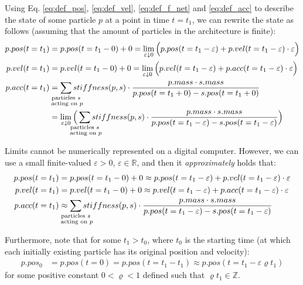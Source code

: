 Using Eq. \eqref{eq:def_pos}, \eqref{eq:def_vel}, \eqref{eq:def_f_net} and \eqref{eq:def_acc} to describe the state of some particle $p$ at a point in time $t=t_1$, we can rewrite the state as follows (assuming that the amount of particles in the architecture is finite):
\begin{align}
    p.pos(t = t_1)  &= p.pos(t = t_1 - 0) + 0 
                    = \lim_{\varepsilon \downarrow 0}\Big(p.pos(t = t_1 - \varepsilon) + p.vel(t = t_1 - \varepsilon) \cdot \varepsilon \Big) \label{eq:pos_eps}\\
    p.vel(t = t_1)  &= p.vel(t = t_1 - 0) + 0 
                    = \lim_{\varepsilon \downarrow 0}\Big(p.vel(t = t_1 - \varepsilon) + p.acc(t = t_1 - \varepsilon) \cdot \varepsilon \Big) \label{eq:vel_eps} \\
    p.acc(t = t_1)  &= \smashoperator{\sum_{\substack{\text{particles $s$}\\\text{ acting on $p$}}}}stiffness(p, s)\cdot\frac{p.mass \cdot s.mass}{p.pos(t=t_1 + 0)-s.pos(t=t_1 + 0)} \nonumber \\
    &= \lim_{\varepsilon \downarrow 0}\Big(\smashoperator{\sum_{\substack{\text{particles $s$}\\\text{ acting on $p$}}}}stiffness(p, s)\cdot\frac{p.mass \cdot s.mass}{p.pos(t=t_1 -\varepsilon)-s.pos(t=t_1 -\varepsilon)}\Big) \label{eq:acc_eps}
\end{align}

Limits cannot be numerically represented on a digital computer. However, we can use a small finite-valued $\varepsilon > 0$, $\varepsilon \in \mathbb{R}$, and then it \textit{approximately} holds that:
\begin{align}
    p.pos(t = t_1)  &= p.pos(t = t_1 - 0) + 0 
                    \approx p.pos(t = t_1 - \varepsilon) + p.vel(t = t_1 - \varepsilon) \cdot \varepsilon \label{eq:pos_eps_approx}\\
    p.vel(t = t_1)  &= p.vel(t = t_1 - 0) + 0 
                    \approx p.vel(t = t_1 - \varepsilon) + p.acc(t = t_1 - \varepsilon) \cdot \varepsilon \label{eq:vel_eps_approx} \\
    p.acc(t = t_1)  &\approx \smashoperator{\sum_{\substack{\text{particles $s$}\\\text{ acting on $p$}}}}stiffness(p, s)\cdot\frac{p.mass \cdot s.mass}{p.pos(t=t_1 -\varepsilon)-s.pos(t=t_1 -\varepsilon)} \label{eq:acc_eps_approx}
\end{align}

Furthermore, note that for some $t_1 > t_0$, where $t_0$ is the starting time (at which each initially existing particle has its original position and velocity):
\begin{align}
    p.pos_0 &= p.pos(t=0) = p.pos(t = t_1 - t_1) \approx p.pos(t = t_1 - \varepsilon \varrho t_1) \label{eq:end_of_recursion}
\end{align}
for some positive constant $0 < \varrho < 1$ defined such that $\varrho t_1 \in \mathbb{Z}$.

